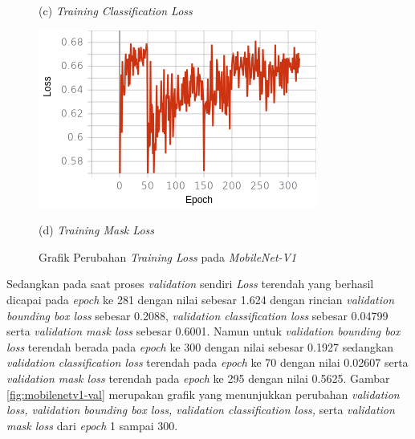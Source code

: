 \begin{figure}[H]
\begin{minipage}{0.45\textwidth}
		\caption*{(c) \textit{Training Classification Loss}}
	\end{minipage}
	\hfill
	\begin{minipage}{0.45\textwidth}
		\includegraphics[width=\textwidth]{gambar/training_resnet50/tugas-akhir-Page 18 (3).png}
		\caption*{(d) \textit{Training Mask Loss}}
	\end{minipage}
	\caption{Grafik Perubahan \textit{Training Loss} pada \textit{MobileNet-V1}}
	\label{fig:mobilenetv1-training}
\end{figure}


Sedangkan pada saat proses \textit{validation} sendiri \textit{Loss} terendah yang berhasil dicapai pada \textit{epoch} ke 281 dengan nilai sebesar 1.624 dengan rincian \textit{validation bounding box loss} sebesar 0.2088, \textit{validation classification loss} sebesar 0.04799 serta \textit{validation mask loss} sebesar 0.6001. Namun untuk \textit{validation bounding box loss} terendah berada pada \textit{epoch} ke 300 dengan nilai sebesar 0.1927 sedangkan \textit{validation classification loss} terendah pada \textit{epoch} ke 70 dengan nilai 0.02607 serta \textit{validation mask loss} terendah pada \textit{epoch} ke 295 dengan nilai 0.5625. Gambar \ref{fig:mobilenetv1-val} merupakan grafik yang menunjukkan perubahan \textit{validation loss, validation bounding box loss, validation classification loss,} serta \textit{validation mask loss} dari \textit{epoch} 1 sampai 300.

